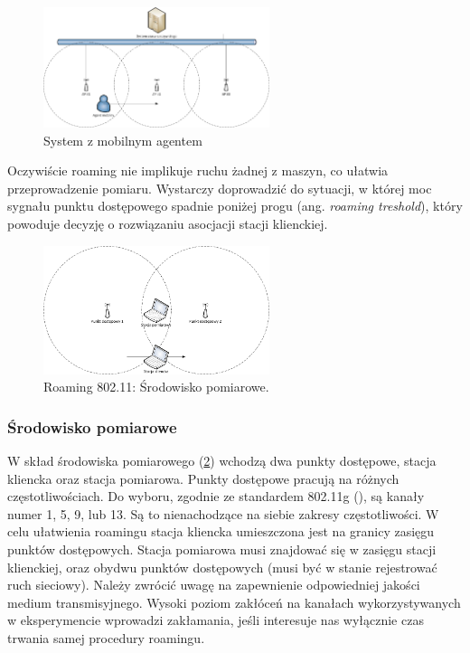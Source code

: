 \begin{figure}[htb]
\begin{center}
\includegraphics[width=250px]{img/System_czasu_rzeczywistego}
\caption{System z mobilnym agentem}
\label{MobileAgentSystem}
\end{center}
\end{figure}

Oczywiście roaming nie implikuje ruchu żadnej z maszyn, co ułatwia przeprowadzenie pomiaru. Wystarczy doprowadzić do sytuacji, w której moc sygnału punktu dostępowego spadnie poniżej progu (ang. \emph{roaming treshold}), który powoduje decyzję o rozwiązaniu asocjacji stacji klienckiej. 

\begin{figure}[htb]
\begin{center}
\includegraphics[width=250px]{img/Roaming}
\caption{Roaming 802.11: Środowisko pomiarowe.}
\label{RoamingEnviroment}
\end{center}
\end{figure}

\subsubsection{Środowisko pomiarowe}

W skład środowiska pomiarowego (\ref{RoamingEnviroment}) wchodzą dwa punkty dostępowe, stacja kliencka oraz stacja pomiarowa. Punkty dostępowe pracują na różnych częstotliwościach. Do wyboru, zgodnie ze standardem 802.11g (\cite{std:IEEE80211}), są kanały numer 1, 5, 9, lub 13. Są to nienachodzące na siebie zakresy częstotliwości. W celu ułatwienia roamingu stacja kliencka umieszczona jest na granicy zasięgu punktów dostępowych. Stacja pomiarowa musi znajdować się w zasięgu stacji klienckiej, oraz obydwu punktów dostępowych (musi być w stanie rejestrować ruch sieciowy). 
Należy zwrócić uwagę na zapewnienie odpowiedniej jakości medium transmisyjnego. Wysoki poziom zakłóceń na kanałach wykorzystywanych w eksperymencie wprowadzi zakłamania, jeśli interesuje nas wyłącznie czas trwania samej procedury roamingu. 

